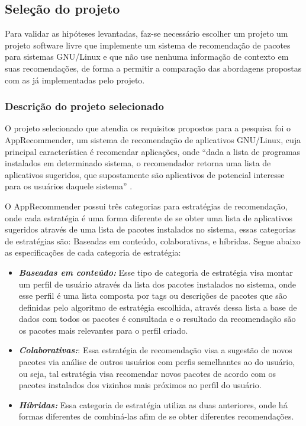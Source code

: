 \subsection{Seleção do projeto}

Para validar as hipóteses levantadas, faz-se necessário escolher um projeto
um projeto software livre que implemente um sistema de recomendação de pacotes
para sistemas GNU/Linux e que não use nenhuma informação de contexto em suas
recomendações, de forma a permitir a comparação das abordagens propostas com as
já implementadas pelo projeto.

\subsubsection{Descrição do projeto selecionado}

O projeto selecionado que atendia os requisitos propostos para a pesquisa foi o AppRecommender,
um sistema de recomendação de aplicativos GNU/Linux, cuja principal característica é recomendar aplicações,
onde “dada a lista de programas instalados em determinado sistema, o recomendador retorna uma lista de aplicativos
sugeridos, que supostamente são aplicativos de potencial interesse para os usuários daquele sistema”
\cite{araujo2011apprecommender}.

O AppRecommender possui três categorias para estratégias de recomendação, onde cada
estratégia é uma forma diferente de se obter uma lista de aplicativos sugeridos
através de uma lista de pacotes instalados no sistema, essas categorias de estratégias
são: Baseadas em conteúdo, colaborativas, e híbridas. Segue abaixo as especificações
de cada categoria de estratégia:

\begin{itemize}
    \item \textit{\textbf{Baseadas em conteúdo:}} Esse tipo de categoria de estratégia
        visa montar um perfil de usuário através da lista dos pacotes instalados no sistema,
        onde esse perfil é uma lista composta por tags ou descrições de pacotes que são
        definidas pelo algoritmo de estratégia escolhida, através dessa lista a base de dados
        com todos os pacotes é consultada e o resultado da recomendação são os pacotes mais
        relevantes para o perfil criado.
    \item \textit{\textbf{Colaborativas:}}: Essa estratégia de recomendação visa
        a sugestão de novos pacotes via análise de outros usuários com perfis
        semelhantes ao do usuário, ou seja, tal estratégia visa recomendar novos
        pacotes de acordo com os pacotes instalados dos vizinhos mais próximos
        ao perfil do usuário.
    \item \textit{\textbf{Híbridas:}} Essa categoria
        de estratégia utiliza as duas anteriores, onde há formas diferentes de combiná-las
    afim de se obter diferentes recomendações.
\end{itemize}

